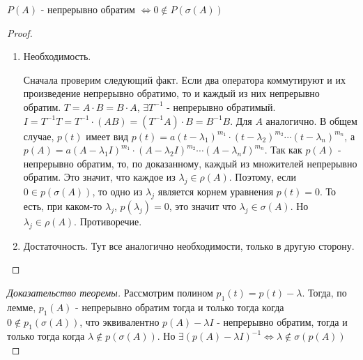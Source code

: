 \begin{lemma}
    
$P(A)$ - непрерывно обратим $\Leftrightarrow  0 \notin P(\sigma(A))$
\end{lemma}
\begin{proof}
    \begin{enumerate}
    \item Необходимость.

    Сначала проверим следующий факт. Если два оператора коммутируют и их произведение непрерывно обратимо, то и каждый из них непрерывно обратим.
    $T = A \cdot B = B \cdot A$, $\exists T^{-1}$ - непрерывно обратимый.
    $I = T^{-1} T = T^{-1}\cdot \left( A  B\right) = \left( T^{-1} A \right) \cdot B = B^{-1} B$. Для $A$ аналогично.
    В общем случае, $p(t)$ имеет вид $p(t) = a (t - \lambda_1)^{m_1} \cdot (t - \lambda_2)^{m_2} \cdots (t - \lambda_n)^{m_n}$, 
    а $p(A) = a (A - \lambda_1 I)^{m_1} \cdot (A - \lambda_2 I)^{m_2} \cdots (A - \lambda_n I)^{m_{n}}$. Так как $p(A)$ - непрерывно обратим, то, по доказанному,  
    каждый из множителей непрерывно обратим. Это значит, что каждое из $\lambda_j \in \rho(A)$. Поэтому, если $0 \in p(\sigma(A))$, 
    то одно из $\lambda_j$ является корнем уравнения $p(t) = 0$. То есть, при каком-то $\lambda_j$, $p(\lambda_j) = 0$, это значит что 
    $\lambda_j \in \sigma(A)$. Но $\lambda_j \in \rho(A)$. Противоречие.
    \item Достаточность. Тут все аналогично необходимости, только в другую сторону.
    

    \end{enumerate}
\end{proof}
\begin{proof}[Доказательство теоремы]
    Рассмотрим полином $p_1(t) = p(t) - \lambda$. Тогда, по лемме, $p_1(A)$ - непрерывно обратим тогда и только тогда когда $0 \notin p_1(\sigma(A))$, 
    что эквивалентно $p(A) - \lambda I$ - непрерывно обратим, тогда и только тогда когда $\lambda \notin p(\sigma(A))$. Но $\exists(p(A) - \lambda I)^{-1} \Leftrightarrow 
    \lambda \notin \sigma(p(A))$
\end{proof}
